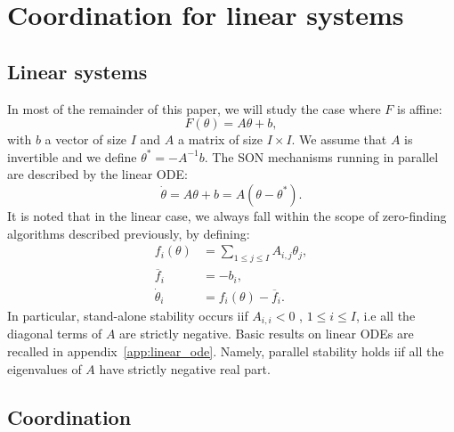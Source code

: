\documentclass[10pt,conference,letterpaper]{IEEEtran}
\begin{document}
\section{Coordination for linear systems}\label{sec:linear_case}
\subsection{Linear systems}
		In most of the remainder of this paper, we will study the case where $F$ is affine:
\begin{equation}\label{eq:son_linear}
	F(\theta) = A \theta + b,
\end{equation}
with $b$ a vector of size $I$ and $A$ a matrix of size $I \times I$. We assume that $A$ is invertible and we define $\theta^* = -A^{-1} b$. The \ac{SON} mechanisms running in parallel are described by the linear \ac{ODE}:
\begin{equation}\label{eq:son_linear_ode}
	\dot{\theta} = A \theta + b = A (\theta - \theta^*).
\end{equation}
	It is noted that in the linear case, we always fall within the scope of zero-finding algorithms described previously, by defining:
\begin{align}\label{eq:son_linear_ode_zero}
	f_i(\theta) &=  \sum_{1 \leq j \leq I} A_{i,j} \theta_j, \\
	\overline{f}_i &= -b_i, \\
	\dot{\theta}_i &= f_i(\theta) - \overline{f}_i.
\end{align}
	In particular, stand-alone stability occurs iif $A_{i,i} < 0$ , $1 \leq i \leq I$, i.e all the diagonal terms of $A$ are strictly negative. Basic results on linear \acp{ODE} are recalled in appendix~\ref{app:linear_ode}. Namely, parallel stability holds iif all the eigenvalues of $A$ have strictly negative real part.

\subsection{Coordination}
\end{document}
